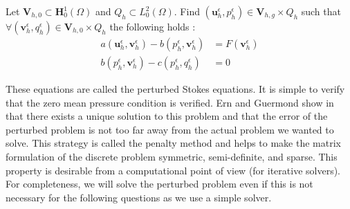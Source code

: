 \documentclass{article}
\begin{document}
Let $\mathbf{V}_{h,0} \subset \mathbf{H}^1_0(\Omega)$ and $Q_{h} \subset L^2_0(\Omega)$.
Find $(\mathbf{u}^\epsilon_h,p^\epsilon_h)\in \mathbf{V}_{h,g} \times Q_h$ such that
$\forall (\mathbf{v}_h^\epsilon, q^\epsilon_h)\in \mathbf{V}_{h,0} \times {Q}_{h}$ the
following holds : 
\begin{align}
	a(\mathbf{u}^\epsilon_h,\mathbf{v}^\epsilon_h) -
	b(p^\epsilon_h,\mathbf{v}^\epsilon_h) &= F(\mathbf{v}_h^\epsilon) \\ b(p^\epsilon_h,\mathbf{v}^\epsilon_h) -
	c(p^\epsilon_h,q^\epsilon_h) &= 0 \nonumber
\end{align}

These equations are called the perturbed Stokes equations. It is simple to
verify that the zero mean pressure condition is verified. Ern and Guermond show in \cite{Ern_Guermond-FEM-2004} that there
exists a unique solution to this problem and that the error of the perturbed
problem is not too far away from the actual problem we wanted to solve. This
strategy is called the penalty method and helps to make the matrix formulation
of the discrete problem symmetric, semi-definite, and sparse. This property is
desirable from a computational point of view (for iterative solvers). For
completeness, we will solve the perturbed problem even if this is not necessary
for the following questions as we use a simple solver.
\end{document}
